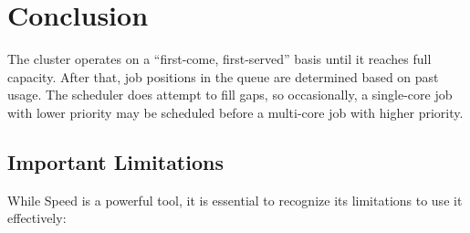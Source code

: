 \documentclass{easychair}
\begin{document}



\section{Conclusion}
\label{sect:conclusion}

The cluster operates on a ``first-come, first-served'' basis until it reaches full capacity.
After that, job positions in the queue are determined based on past usage.
The scheduler does attempt to fill gaps, so occasionally, a single-core job with lower priority 
may be scheduled before a multi-core job with higher priority.

\subsection{Important Limitations}
\label{sect:limitations}

While Speed is a powerful tool, it is essential to recognize its limitations to use it effectively:
\end{document}
